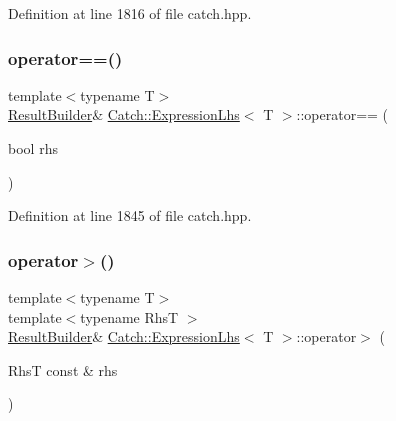 Definition at line 1816 of file catch.\+hpp.

\hypertarget{class_catch_1_1_expression_lhs_a6001030bcfbabc3981013ddffb3e3bb6}{}\label{class_catch_1_1_expression_lhs_a6001030bcfbabc3981013ddffb3e3bb6} 
\subsubsection{\texorpdfstring{operator==()}{operator==()}\hspace{0.1cm}{\footnotesize\ttfamily [2/2]}}
{\footnotesize\ttfamily template$<$typename T$>$ \\
\hyperlink{class_catch_1_1_result_builder}{Result\+Builder}\& \hyperlink{class_catch_1_1_expression_lhs}{Catch\+::\+Expression\+Lhs}$<$ T $>$\+::operator== (\begin{DoxyParamCaption}\item[{bool}]{rhs }\end{DoxyParamCaption})\hspace{0.3cm}{\ttfamily [inline]}}



Definition at line 1845 of file catch.\+hpp.

\hypertarget{class_catch_1_1_expression_lhs_ad3602a7ad945c751004065b1007dc183}{}\label{class_catch_1_1_expression_lhs_ad3602a7ad945c751004065b1007dc183} 
\subsubsection{\texorpdfstring{operator$>$()}{operator>()}}
{\footnotesize\ttfamily template$<$typename T$>$ \\
template$<$typename RhsT $>$ \\
\hyperlink{class_catch_1_1_result_builder}{Result\+Builder}\& \hyperlink{class_catch_1_1_expression_lhs}{Catch\+::\+Expression\+Lhs}$<$ T $>$\+::operator$>$ (\begin{DoxyParamCaption}\item[{RhsT const \&}]{rhs }\end{DoxyParamCaption})\hspace{0.3cm}{\ttfamily [inline]}}



